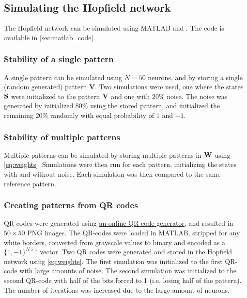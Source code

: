 \subsection{Simulating the Hopfield network}
The Hopfield network can be simulated using MATLAB and . The code is available in \cref{sec:matlab_code}.
\subsubsection*{Stability of a single pattern}
A single pattern can be simulated using $N=50$ neurons, and by storing a single (random generated) pattern $\mathbf{V}$. Two simulations were used, one where the states $\bf S$ were initialized to the pattern $\bf V$ and one with $20\%$ noise. The noise was generated by initialized $80\%$ using the stored pattern, and initialized the remaining $20\%$ randomly with equal probability of $1$ and $-1$.
\subsubsection*{Stability of multiple patterns}
Multiple patterns can be simulated by storing multiple patterns in $\bf W$ using \cref{eq:weights}. Simulations were then run for each pattern, initializing the states with and without noise. Each simulation was then compared to the same reference pattern.

\subsubsection*{Creating patterns from QR codes}
QR codes were generated using \href{https://miniwebtool.com/qr-code-generator/}{an online QR-code generator}, and resulted in $50 \times 50$ PNG images. The QR-codes were loaded in MATLAB, stripped for any white borders, converted from grayscale values to binary and encoded as a $\{1, -1\}^{N \times 1}$ vector. Two QR codes were generated and stored in the Hopfield network using \cref{eq:weights}. The first simulation was initialized to the first QR-code with large amounts of noise. The second simulation was initialized to the second QR-code with half of the bits forced to 1 (i.e. losing half of the pattern). The number of iterations was increased due to the large amount of neurons.



